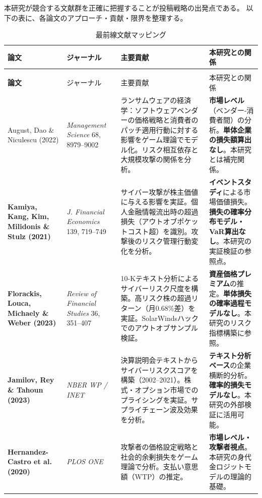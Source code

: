 \documentclass[a4paper,11pt]{article}
\theoremstyle{definition}
\begin{document}
本研究が競合する文献群を正確に把握することが投稿戦略の出発点である。
以下の表に、各論文のアプローチ・貢献・限界を整理する。

\begin{longtable}{>{\bfseries\small}p{3.2cm}p{3cm}p{4.5cm}p{3.5cm}}
  \caption{最前線文献マッピング} \label{tab:literature} \\
  \toprule
  \rowcolor{LightBlue}
  論文 & ジャーナル & 主要貢献 & 本研究との関係 \\
  \midrule
  \endfirsthead
  \multicolumn{4}{c}{\small\itshape 表 \ref{tab:literature} つづき} \\
  \toprule
  \rowcolor{LightBlue}
  論文 & ジャーナル & 主要貢献 & 本研究との関係 \\
  \midrule
  \endhead
  \bottomrule
  \endlastfoot

  August, Dao \& Niculescu (2022) &
  \textit{Management Science} 68, 8979--9002 &
  ランサムウェアの経済学：ソフトウェアベンダーの価格戦略と消費者のパッチ適用行動に対する影響をゲーム理論でモデル化。リスク相互依存と大規模攻撃の関係を分析。 &
  \textbf{市場レベル}（ベンダー-消費者間）の分析。\textbf{単体企業の損失額算出なし}。本研究とは補完関係。 \\

  Kamiya, Kang, Kim, Milidonis \& Stulz (2021) &
  \textit{J. Financial Economics} 139, 719--749 &
  サイバー攻撃が株主価値に与える影響を実証。個人金融情報流出時の超過損失（アウトオブポケットコスト超）を識別。攻撃後のリスク管理行動変化を分析。 &
  \textbf{イベントスタディ}による市場価値損失。\textbf{損失の確率分布モデル・VaR算出なし}。本研究の実証検証の参照点。 \\

  Florackis, Louca, Michaely \& Weber (2023) &
  \textit{Review of Financial Studies} 36, 351--407 &
  10-Kテキスト分析によるサイバーリスク尺度を構築。高リスク株の超過リターン（月0.68\%差）を実証。SolarWindsハックでのアウトオブサンプル検証。 &
  \textbf{資産価格プレミアム}の推定。\textbf{単体損失の確率過程モデルなし}。本研究のリスク指標構築に参照。 \\

  Jamilov, Rey \& Tahoun (2023) &
  \textit{NBER WP / INET} &
  決算説明会テキストからサイバーリスクスコアを構築（2002--2021）。株式・オプション市場でのプライシングを実証。サプライチェーン波及効果を分析。 &
  \textbf{テキスト分析ベース}の企業横断的分析。\textbf{確率的損失モデルなし}。本研究の外部検証に活用可能。 \\

  Hernandez-Castro et al. (2020) &
  \textit{PLOS ONE} &
  攻撃者の価格設定戦略と社会的余剰損失をゲーム理論で分析。支払い意思額（WTP）の推定。 &
  \textbf{市場レベル・攻撃者視点}。本研究の身代金ロジットモデルの理論的基礎。 \\


\end{longtable}
\end{document}
